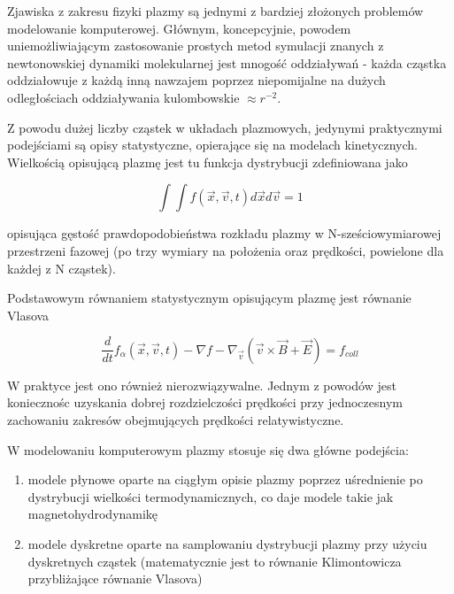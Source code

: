 Zjawiska z zakresu fizyki plazmy są jednymi z bardziej złożonych problemów modelowanie komputerowej.
Głównym, koncepcyjnie, powodem uniemożliwiającym zastosowanie prostych metod symulacji
znanych z newtonowskiej dynamiki molekularnej jest mnogość oddziaływań - każda cząstka oddziałowuje
z każdą inną nawzajem poprzez niepomijalne na dużych odległościach oddziaływania kulombowskie $\approx r^{-2}$.

Z powodu dużej liczby cząstek w układach plazmowych, jedynymi praktycznymi podejściami są opisy statystyczne,
opierające się na modelach kinetycznych. Wielkością opisującą plazmę jest tu funkcja dystrybucji zdefiniowana jako


\begin{equation}
    \int \int f(\vec{x}, \vec{v}, t) d\vec{x} d\vec{v} = 1 %
    \label{eqn:distribution-function}
\end{equation}


opisująca gęstość prawdopodobieństwa rozkładu plazmy w N-sześciowymiarowej przestrzeni fazowej (po trzy wymiary na położenia
oraz prędkości, powielone dla każdej z N cząstek).


Podstawowym równaniem statystycznym opisującym plazmę jest równanie Vlasova %

\begin{equation}
    \frac{ d} {dt} f_{\alpha} (\vec{x}, \vec{v}, t) - \nabla f - \nabla_{\vec{v}} (\vec{v} \times \vec{B} + \vec{E})= f_{coll}
    \label{eqn:Vlasov}
\end{equation}

W praktyce jest ono również nierozwiązywalne. Jednym z powodów jest koniecznośc uzyskania dobrej rozdzielczości prędkości
przy jednoczesnym zachowaniu zakresów obejmujących prędkości relatywistyczne. %

W modelowaniu komputerowym plazmy stosuje się dwa główne podejścia:
\begin{enumerate}
\item modele płynowe oparte na ciągłym opisie plazmy poprzez uśrednienie po dystrybucji
wielkości termodynamicznych, co daje modele takie jak magnetohydrodynamikę %
\item modele dyskretne oparte na samplowaniu dystrybucji plazmy przy użyciu dyskretnych cząstek
        (matematycznie jest to równanie Klimontowicza przybliżające równanie Vlasova) %
\end{enumerate}

